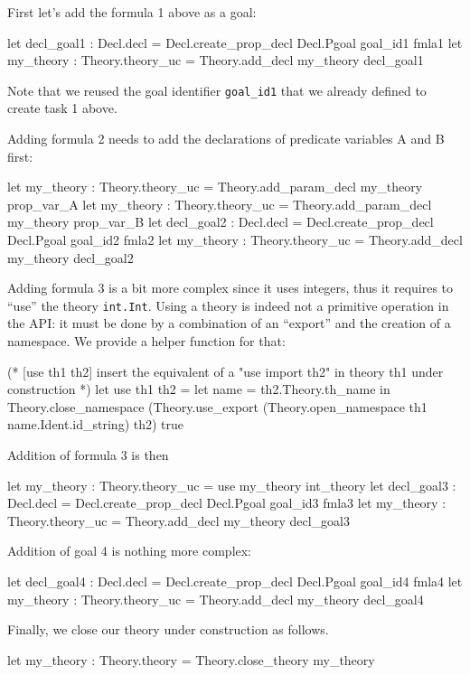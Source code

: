 First let's add the formula 1 above as a goal:
\begin{ocamlcode}
let decl_goal1 : Decl.decl =
  Decl.create_prop_decl Decl.Pgoal goal_id1 fmla1 
let my_theory : Theory.theory_uc =
  Theory.add_decl my_theory decl_goal1
\end{ocamlcode}
Note that we reused the goal identifier \verb|goal_id1| that we
already defined to create task 1 above.

Adding formula 2 needs to add the declarations of predicate variables A
and B first:
\begin{ocamlcode}
let my_theory : Theory.theory_uc = 
  Theory.add_param_decl my_theory prop_var_A 
let my_theory : Theory.theory_uc = 
  Theory.add_param_decl my_theory prop_var_B 
let decl_goal2 : Decl.decl =
  Decl.create_prop_decl Decl.Pgoal goal_id2 fmla2 
let my_theory : Theory.theory_uc = Theory.add_decl my_theory decl_goal2
\end{ocamlcode}

Adding formula 3 is a bit more complex since it uses integers, thus it
requires to ``use'' the theory \verb|int.Int|. Using a theory is
indeed not a primitive operation in the API: it must be done by a
combination of an ``export'' and the creation of a namespace. We
provide a helper function for that:
\begin{ocamlcode}
(* [use th1 th2] insert the equivalent of a "use import th2" in
  theory th1 under construction *) 
let use th1 th2 = 
  let name = th2.Theory.th_name in 
  Theory.close_namespace 
    (Theory.use_export 
      (Theory.open_namespace th1 name.Ident.id_string) th2) true
\end{ocamlcode}
Addition of formula 3 is then
\begin{ocamlcode}
let my_theory : Theory.theory_uc = use my_theory int_theory
let decl_goal3 : Decl.decl = 
  Decl.create_prop_decl Decl.Pgoal goal_id3 fmla3
let my_theory : Theory.theory_uc = 
  Theory.add_decl my_theory decl_goal3  
\end{ocamlcode}

Addition of goal 4 is nothing more complex:
\begin{ocamlcode}
let decl_goal4 : Decl.decl = 
  Decl.create_prop_decl Decl.Pgoal goal_id4 fmla4
let my_theory : 
  Theory.theory_uc = Theory.add_decl my_theory decl_goal4  
\end{ocamlcode}

Finally, we close our theory under construction as follows.
\begin{ocamlcode}
let my_theory : Theory.theory = Theory.close_theory my_theory  
\end{ocamlcode}

